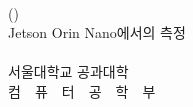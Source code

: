 \begin{center}
    \vspace*{1.0cm}
    \fontsize{24pt}{34pt}\selectfont \ReportTitleKo \\
    \vspace{0.5cm}
    \fontsize{18pt}{24pt}\selectfont (\ReportTitle) \\
    \vspace{2.5cm}
    \fontsize{16pt}{24pt}\selectfont
    Jetson Orin Nano에서의 측정 \\
    \vfill
    \fontsize{18pt}{18pt}\selectfont
    ~~~~~~ \\
    \vspace{2cm}
    \fontsize{20pt}{20pt}\selectfont
    서울대학교 공과대학 \\
    컴~~퓨~~터~~공~~학~~부 \\
    \AuthorKoSpaced \\
    \vspace{1cm}
\end{center}
